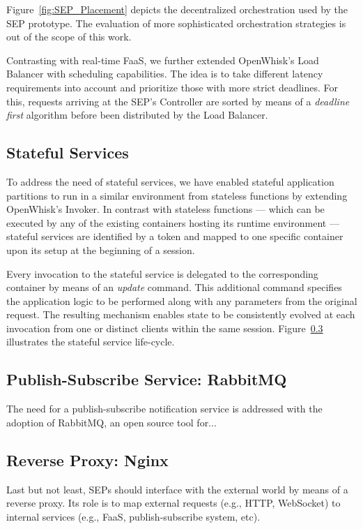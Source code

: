 \documentclass[letterpaper, 10 pt, conference]{ieeeconf}  %
\begin{document}
Figure~\ref{fig:SEP_Placement} depicts the decentralized orchestration used by the SEP prototype. The evaluation of more sophisticated orchestration strategies is out of the scope of this work. 


Contrasting with real-time FaaS, we further extended OpenWhisk's Load Balancer with scheduling capabilities. The idea is to take different latency requirements into account and prioritize those with more strict deadlines. For this, requests arriving at the SEP's Controller are sorted by means of a \textit{deadline first} algorithm before been distributed by the Load Balancer. 

\subsection{Stateful Services}

To address the need of stateful services, we have enabled stateful application partitions to run in a similar environment from stateless functions by extending OpenWhisk's Invoker. In contrast with stateless functions --- which can be executed by any of the existing containers hosting its runtime environment --- stateful services are identified by a token and mapped to one specific container upon its setup at the beginning of a session. 

Every invocation to the stateful service is delegated to the corresponding container by means of an \textit{update} command. This additional command specifies the application logic to be performed along with any parameters from the original request. The resulting mechanism enables state to be consistently evolved at each invocation from one or distinct clients within the same session. Figure~\ref{} illustrates the stateful service life-cycle.

\subsection{Publish-Subscribe Service: RabbitMQ}

The need for a publish-subscribe notification service is addressed with the adoption of RabbitMQ, an open source tool for...

\subsection{Reverse Proxy: Nginx}

Last but not least, SEPs should interface with the external world by means of a reverse proxy. Its role is to map external requests (e.g., HTTP, WebSocket) to internal services (e.g., FaaS, publish-subscribe system, etc). 
\end{document}
